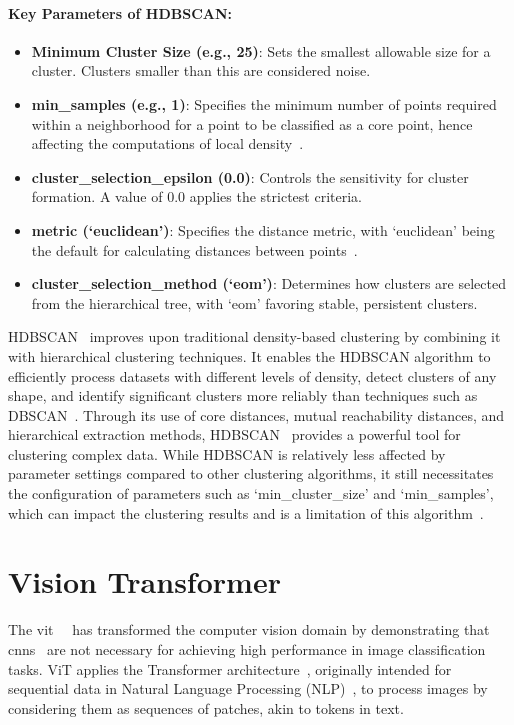 \paragraph{Key Parameters of HDBSCAN:}

\begin{itemize}
    \item \textbf{Minimum Cluster Size (e.g., 25)}: Sets the smallest allowable size for a cluster. Clusters smaller than this are considered noise.
    \item \textbf{min\_samples (e.g., 1)}: Specifies the minimum number of points required within a neighborhood for a point to be classified as a core point, hence affecting the computations of local density~\citep{HDBSCAN_algo_campello2013density, HDBSCAN_2015_campello2015hierarchical, hdbscanComparingPython}.
    \item \textbf{cluster\_selection\_epsilon (0.0)}: Controls the sensitivity for cluster formation. A value of 0.0 applies the strictest criteria.
    \item \textbf{metric (`euclidean')}: Specifies the distance metric, with `euclidean' being the default for calculating distances between points~\citep{hdbscanComparingPython}.
    \item \textbf{cluster\_selection\_method (`eom')}: Determines how clusters are selected from the hierarchical tree, with `eom' favoring stable, persistent clusters.
\end{itemize}

HDBSCAN~\citep{HDBSCAN_algo_campello2013density} improves upon traditional density-based clustering by combining it with hierarchical clustering techniques. It enables the HDBSCAN algorithm to efficiently process datasets with different levels of density, detect clusters of any shape, and identify significant clusters more reliably than techniques such as DBSCAN~\citep{DBSCAN_algo_ester1996density}. Through its use of core distances, mutual reachability distances, and hierarchical extraction methods, HDBSCAN~\citep{HDBSCAN_algo_campello2013density} provides a powerful tool for clustering complex data. While HDBSCAN is relatively less affected by parameter settings compared to other clustering algorithms, it still necessitates the configuration of parameters such as `min\_cluster\_size' and `min\_samples', which can impact the clustering results and is a limitation of this algorithm~\citep{hdbscanComparingPython, HDBSCAN_2015_campello2015hierarchical}.

\section{Vision Transformer}
The \gls{vit}~\citep{Vit_Paper_Dosovitskiy2020AnII}~ has transformed the computer vision domain by demonstrating that \gls{cnn}s~\citep{CNN_o2015introduction} are not necessary for achieving high performance in image classification tasks. ViT applies the Transformer architecture~\citep{Vaswani2017AttentionIA}, originally intended for sequential data in Natural Language Processing (NLP)~\citep{NLP_Book_eisenstein2019introduction}, to process images by considering them as sequences of patches, akin to tokens in text. 

